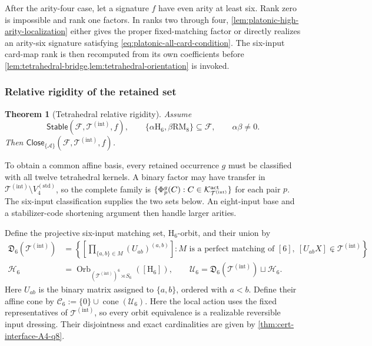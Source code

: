 \documentclass[11pt,letterpaper,onecolumn]{article}
\theoremstyle{plain}
\newtheorem{theorem}{Theorem}[section]
\theoremstyle{definition}
\theoremstyle{remark}
\newcommand{\cF}{\mathcal F}
\newcommand{\cA}{\mathscr A}
\newcommand{\KleinStd}{{V_4^{(\mathrm{std})}}}
\newcommand{\TetInt}{{\mathcal T^{(\mathrm{int})}}}
\newcommand{\Stable}{\mathsf{Stable}}
\newcommand{\Close}{\mathsf{Close}}
\newcommand{\RMcore}{\mathrm{RM}_8}
\newcommand{\Hcore}{\mathrm{H}_6}
\begin{document}
After the arity-four case, let a signature \(f\) have even arity at
least six.  Rank zero is impossible and rank one factors.  In ranks two
through four, \cref{lem:platonic-high-arity-localization} either gives the
proper fixed-matching factor or directly realizes an arity-six signature satisfying \cref{eq:platonic-all-card-condition}.
The six-input card-map rank is then recomputed from its own coefficients before
\cref{lem:tetrahedral-bridge,lem:tetrahedral-orientation} is invoked. 

\subsubsection{Relative rigidity of the retained set}

\begin{theorem}[Tetrahedral relative rigidity]
\label{thm:a4-relative}
Assume
\[
 \Stable(\cF,\TetInt,f),\qquad
 \{\alpha\Hcore,\beta\RMcore\}\subseteq\cF,\qquad
 \alpha\beta\ne0.
\]
Then \(\Close_{\{\cA\}}(\cF,\TetInt,f)\).
\end{theorem}

To obtain a common affine basis, every retained occurrence \(g\) must be
classified with all twelve tetrahedral kernels.  A binary factor may have
transfer in \(\TetInt\setminus \KleinStd\), so the complete family is
\(\{\Phi_p^g(C):C\in\mathcal K_{\TetInt}^{\rm act}\}\) for each pair
\(p\).  The six-input classification supplies the two sets below. An
eight-input base and a stabilizer-code shortening argument then handle
larger arities.

Define the projective six-input matching set, \(\Hcore\)-orbit, and their union by
\begin{align*}
 \mathfrak D_6(\TetInt)
   &=\left\{\left[\prod_{\{a,b\}\in M}(U_{ab})^{(a,b)}\right]:
       M\text{ is a perfect matching of }[6],\ [U_{ab}X]\in\TetInt
     \right\},\\
 \mathscr H_6
   &=\operatorname{Orb}_{(\TetInt)^6\rtimes S_6}([\Hcore]),
 \qquad
 \mathscr U_6=\mathfrak D_6(\TetInt)\sqcup\mathscr H_6.
\end{align*}
Here \(U_{ab}\) is the binary matrix assigned to \(\{a,b\}\), ordered with \(a<b\). Define their affine cone by
\(\mathscr C_6:=\{0\}\cup\operatorname{cone}(\mathscr U_6)\).
Here the local action uses the fixed representatives of
\(\TetInt\), so every orbit equivalence is a realizable reversible input
dressing.  Their disjointness and exact cardinalities are given by
\cref{thm:cert-interface-A4-q8}.
\end{document}
